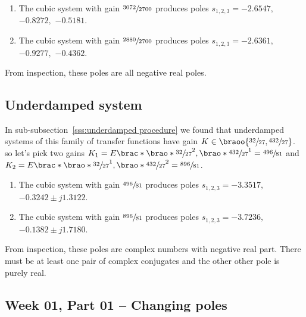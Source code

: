 \documentclass[12pt]{article}
\DeclarePairedDelimiter\brao()%
\DeclarePairedDelimiter\brac[]%
\begin{document}
\begin{enumerate}
    \item 
        The cubic system with gain $\sfrac{3072}{2700}$ produces poles $s_{1,2,3} = -2.6547,$ $-0.8272,$ $-0.5181$.
    \item
        The cubic system with gain $\sfrac{2880}{2700}$ produces poles $s_{1,2,3} = -2.6361,$ $-0.9277,$ $-0.4362$.
\end{enumerate}

From inspection, these poles are all negative real poles.

\subsection{Underdamped system}

In sub-subsection~\ref{sss:underdamped procedure} we found that underdamped systems of this family of transfer functions have gain $K \in \braoo{\sfrac{32}{27}, \sfrac{432}{27}}$.
so let's pick two gains $K_1 = E\brac*{\brao*{\sfrac{32}{27}}^2, \brao*{\sfrac{432}{27}}^1} = \sfrac{496}{81}$ and $K_2 = E\brac*{\brao*{\sfrac{32}{27}}^1, \brao*{\sfrac{432}{27}}^2} = \sfrac{896}{81}$.

\begin{enumerate}
    \item 
        The cubic system with gain $\sfrac{496}{81}$ produces poles $s_{1,2,3} = -3.3517,$ $-0.3242 \pm j1.3122$.
    \item
        The cubic system with gain $\sfrac{896}{81}$ produces poles $s_{1,2,3} = -3.7236,$ $-0.1382 \pm j1.7180$.
\end{enumerate}

From inspection, these poles are complex numbers with negative real part. There must be at least one pair of complex conjugates and the other other pole is purely real.

\subsection{Week 01, Part 01 -- Changing poles}
\end{document}
